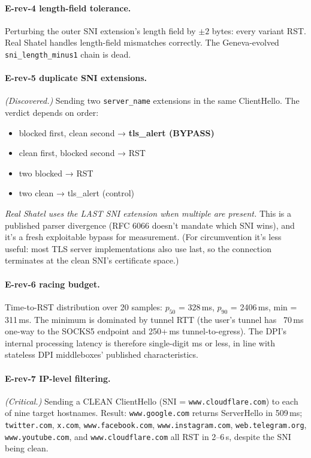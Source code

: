 \documentclass[letterpaper,twocolumn,10pt]{article}
\begin{document}
\paragraph{E-rev-4 length-field tolerance.}
Perturbing the outer SNI extension's length field by $\pm 2$ bytes:
every variant RST. Real Shatel handles length-field mismatches
correctly. The Geneva-evolved \texttt{sni\_length\_minus1} chain is
dead.

\paragraph{E-rev-5 duplicate SNI extensions.} \emph{(Discovered.)}
Sending two \texttt{server\_name} extensions in the same
ClientHello. The verdict depends on order:
\begin{itemize}
    \item blocked first, clean second → \textbf{tls\_alert (BYPASS)}
    \item clean first, blocked second → RST
    \item two blocked → RST
    \item two clean → tls\_alert (control)
\end{itemize}
\emph{Real Shatel uses the LAST SNI extension when multiple are
present.} This is a published parser divergence (RFC 6066 doesn't
mandate which SNI wins), and it's a fresh exploitable bypass for
measurement. (For circumvention it's less useful: most TLS server
implementations also use last, so the connection terminates at the
clean SNI's certificate space.)

\paragraph{E-rev-6 racing budget.}
Time-to-RST distribution over 20 samples: $p_{50}$ = 328\,ms,
$p_{90}$ = 2406\,ms, min = 311\,ms. The minimum is dominated by
tunnel RTT (the user's tunnel has ~70\,ms one-way to the SOCKS5
endpoint and 250+\,ms tunnel-to-egress). The DPI's internal
processing latency is therefore single-digit ms or less, in line
with stateless DPI middleboxes' published characteristics.

\paragraph{E-rev-7 IP-level filtering.} \emph{(Critical.)}
Sending a CLEAN ClientHello (SNI = \texttt{www.cloudflare.com}) to
each of nine target hostnames. Result: \texttt{www.google.com}
returns ServerHello in 509\,ms; \texttt{twitter.com}, \texttt{x.com},
\texttt{www.facebook.com}, \texttt{www.instagram.com},
\texttt{web.telegram.org}, \texttt{www.youtube.com}, and
\texttt{www.cloudflare.com} all RST in 2--6\,s, despite the SNI being
clean.
\end{document}
